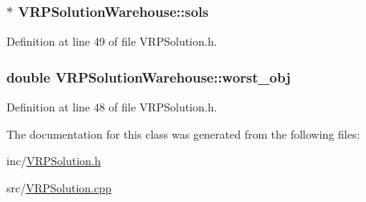 \hypertarget{class_v_r_p_solution_warehouse_a509d78c5ebfba34d1354c09fdaaebeac}{
\subsubsection[{sols}]{$\ast$ {\bf VRPSolutionWarehouse::sols}}}
\label{class_v_r_p_solution_warehouse_a509d78c5ebfba34d1354c09fdaaebeac}


Definition at line 49 of file VRPSolution.h.

\hypertarget{class_v_r_p_solution_warehouse_a999b6c14614396ca2fc47a00d8d95a55}{
\subsubsection[{worst\_\-obj}]{\setlength{\rightskip}{0pt plus 5cm}double {\bf VRPSolutionWarehouse::worst\_\-obj}}}
\label{class_v_r_p_solution_warehouse_a999b6c14614396ca2fc47a00d8d95a55}


Definition at line 48 of file VRPSolution.h.



The documentation for this class was generated from the following files:\begin{DoxyCompactItemize}
\item 
inc/\hyperlink{_v_r_p_solution_8h}{VRPSolution.h}\item 
src/\hyperlink{_v_r_p_solution_8cpp}{VRPSolution.cpp}\end{DoxyCompactItemize}

